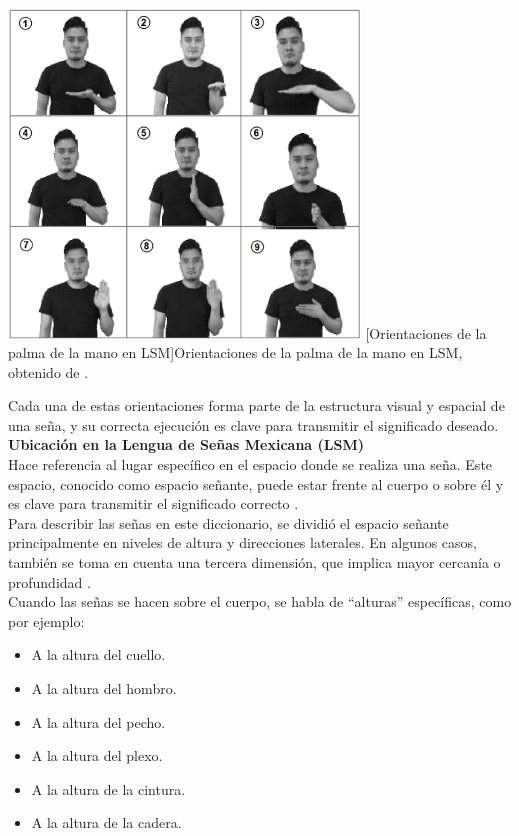 \begin{center}
    \includegraphics[width=0.7\textwidth]{Images/Cap 2/Orientacion_Palma_Mano.png}
    [Orientaciones de la palma de la mano en LSM]{Orientaciones de la palma de la mano en LSM, obtenido de \cite{ref37}.}  %
\end{center}

Cada una de estas orientaciones forma parte de la estructura visual y espacial de una seña, y su correcta ejecución es clave para transmitir el significado deseado.\\

\textbf{Ubicación en la Lengua de Señas Mexicana (LSM)}\\
Hace referencia al lugar específico en el espacio donde se realiza una seña. Este espacio, conocido como espacio señante, puede estar frente al cuerpo o sobre él y es clave para transmitir el significado correcto \cite{ref37}.\\

Para describir las señas en este diccionario, se dividió el espacio señante principalmente en niveles de altura y direcciones laterales. En algunos casos, también se toma en cuenta una tercera dimensión, que implica mayor cercanía o profundidad \cite{ref37}.\\

Cuando las señas se hacen sobre el cuerpo, se habla de “alturas” específicas, como por ejemplo:
\begin{itemize}
    \item A la altura del cuello.
    \item A la altura del hombro.
    \item A la altura del pecho.
    \item A la altura del plexo.
    \item A la altura de la cintura.
    \item A la altura de la cadera.
\end{itemize}

